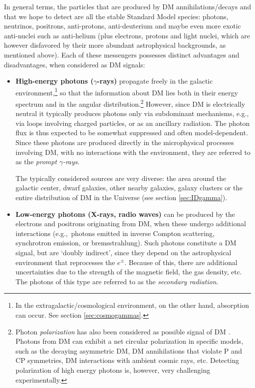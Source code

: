 In general terms, the particles that are produced by DM annihilations/decays and that we hope to detect are all the stable Standard Model species: photons, neutrinos, positrons, anti-protons, anti-deuterium and maybe even more exotic anti-nuclei such as anti-helium (plus electrons, protons and light nuclei, which are however disfavored by their   more abundant astrophysical backgrounds, as mentioned above).
Each of these messengers possesses distinct advantages and disadvantages, when considered as DM signals:
\begin{itemize}
\item[$\circ$] {\bf High-energy photons ($\gamma$-rays)}  propagate freely in the galactic environment,\footnote{In the extragalactic/cosmological environment, on the other hand, absorption can occur. See section \ref{sec:cosmogammas}.} so that the information about DM lies both in their energy spectrum and in the angular distribution.\footnote{Photon {\em polarization} has also been considered as possible signal of DM  \cite{gammapolarization}. Photons from DM can exhibit a net circular polarization in specific models, such as the decaying asymmetric DM,  DM annihilations that violate P and CP symmetries, DM interactions with ambient cosmic rays, etc. Detecting polarization of high energy photons is, however, very challenging experimentally.} 
However, since DM is electrically neutral it typically produces photons only via subdominant mechanisms, e.g., via loops involving charged particles, or as an ancillary radiation. The photon flux is thus expected to be somewhat suppressed and often model-dependent. 
Since these photons are produced directly in the microphysical processes involving DM, with no interactions with the environment, they are referred to as the {\em prompt $\gamma$-rays}. 

The typically considered sources are very diverse: the area around the galactic center, dwarf galaxies, other nearby galaxies, galaxy clusters or the entire distribution of DM in the Universe (see section \ref{sec:IDgamma}).

\item[$\circ$] {\bf Low-energy photons (X-rays, radio waves)} 
can be produced by the electrons and positrons originating from DM, when these undergo additional interactions (e.g.,\ photons emitted in inverse Compton scattering, synchrotron emission, or bremsstrahlung). 
Such photons constitute a DM signal, but are `doubly indirect', since they depend on the astrophysical
environment that reprocesses the $e^\pm$. Because of this, there are additional uncertainties due to the strength of the magnetic field, the gas density, etc. 
The photons of this type are referred to as the {\em secondary radiation}. 


\end{itemize}
